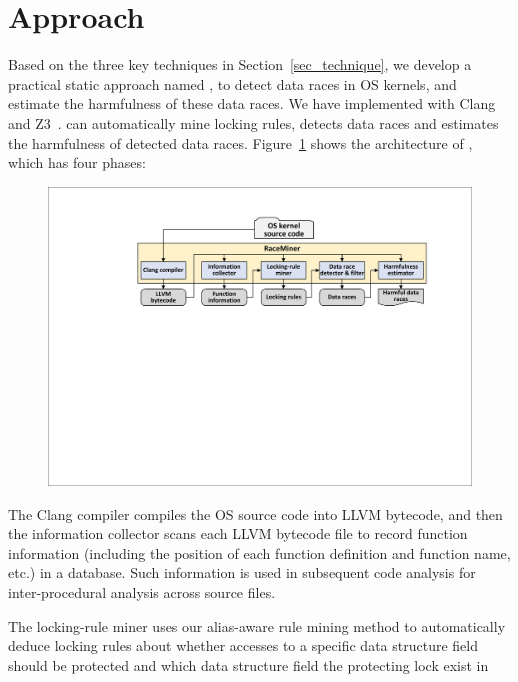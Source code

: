 \section{\sys Approach}
\label{sec_framework}

Based on the three key techniques in Section~\ref{sec_technique}, we develop a 
practical static approach named \sys, to detect data races in OS kernels, and 
estimate the harmfulness of these data races. We have implemented \sys with 
Clang~\cite{clang} and Z3~\cite{z3}. \sys can automatically mine locking rules, 
detects data races and estimates the harmfulness of detected data races. 
Figure~\ref{fig_architecture} shows the architecture of \sys, which has four 
phases:

\begin{figure}[htbp]
	\centering
	\includegraphics[width=1\linewidth]{figures/fig_architecture.pdf}
	\label{fig_architecture}
\end{figure}

 The Clang compiler compiles the OS source 
code into LLVM bytecode, and then the information collector scans each LLVM 
bytecode file to record function information (including the position of each 
function definition and function name, etc.) in a database. Such information is 
used in subsequent code analysis for inter-procedural analysis across source 
files.

 The locking-rule miner uses our alias-aware rule 
mining method to automatically deduce locking rules about whether accesses to a 
specific data structure field should be protected and which data structure 
field the protecting lock exist in

